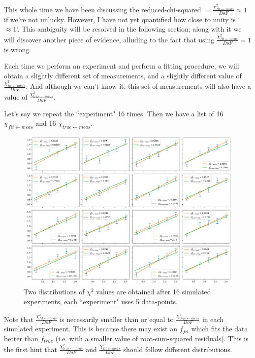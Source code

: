 \documentclass[a4paper, 12pt]{article}
\newcommand{\chifit}{\frac{\chi^2_{fit\leftarrow meas}}{DoF} }
\newcommand{\chitrue}{\frac{\chi^2_{true\leftarrow meas}}{DoF}}
\begin{document}
This whole time we have been discussing the reduced-chi-squared $=\chifit \approx 1$ if we're not unlucky.
However, I have not yet quantified how close to unity is `$\approx 1$'. This ambiguity will be resolved in the following section; along with it we will discover another piece of evidence, alluding to the fact that using $\chifit=1$ is wrong.

Each time we perform an experiment and perform a fitting procedure, we will obtain a slightly different set of measurements, and a slightly different value of $\chifit$. And although we can't know it, this set of measurements will also have a value of $\chitrue$.

Let's say we repeat the ``experiment" 16 times. Then we have a list of 16 $\chi_{fit\leftarrow meas}$ and 16 $\chi_{true\leftarrow meas}$.

\begin{figure}[H]
\centering
\includegraphics[width=1.1\textwidth]{Ensemble_of_linregress.png} %
\caption{Two distributions of $\chi^2$ values are obtained after 16 simulated experiments, each ``experiment" uses 5 data-points.} \label{Ensemble_of_linregress}
\end{figure}

Note that $\chifit$ is necessarily smaller than or equal to $\chitrue$ in each simulated experiment. This is because there may exist an $f_{fit}$ which fits the data better than $f_{true}$ (i.e. with a smaller value of root-sum-squared residuals). This is the first hint that $\chitrue$ and $\chifit$ should follow different distributions.
\end{document}
